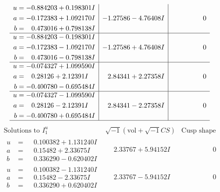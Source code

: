\documentclass[1p]{elsarticle_modified}
\theoremstyle{definition}
\newcommand{\I}{\sqrt{-1}}
\begin{document}
$$\begin{array}{c|c|c}
\begin{aligned}
u &= -0.884203 + 0.198301 I \\
a &= -0.172383 + 1.092170 I \\
b &= \phantom{-}0.473016 + 0.798138 I\end{aligned}
 & -1.27586 - 4.76408 I & \phantom{-0.000000 } 0 \\ \hline\begin{aligned}
u &= -0.884203 - 0.198301 I \\
a &= -0.172383 - 1.092170 I \\
b &= \phantom{-}0.473016 - 0.798138 I\end{aligned}
 & -1.27586 + 4.76408 I & \phantom{-0.000000 } 0 \\ \hline\begin{aligned}
u &= -0.074327 + 1.099590 I \\
a &= \phantom{-}0.28126 + 2.12391 I \\
b &= -0.400780 - 0.695484 I\end{aligned}
 & \phantom{-}2.84341 + 2.27358 I & \phantom{-0.000000 } 0 \\ \hline\begin{aligned}
u &= -0.074327 - 1.099590 I \\
a &= \phantom{-}0.28126 - 2.12391 I \\
b &= -0.400780 + 0.695484 I\end{aligned}
 & \phantom{-}2.84341 - 2.27358 I & \phantom{-0.000000 } 0\\
 \hline 
 \end{array}$$\newpage$$\begin{array}{c|c|c}  
\text{Solutions to }I^u_{1}& \I (\text{vol} + \sqrt{-1}CS) & \text{Cusp shape}\\
 \hline 
\begin{aligned}
u &= \phantom{-}0.100382 + 1.131240 I \\
a &= \phantom{-}0.15482 + 2.33675 I \\
b &= \phantom{-}0.336290 - 0.620402 I\end{aligned}
 & \phantom{-}2.33767 + 5.94152 I & \phantom{-0.000000 } 0 \\ \hline\begin{aligned}
u &= \phantom{-}0.100382 - 1.131240 I \\
a &= \phantom{-}0.15482 - 2.33675 I \\
b &= \phantom{-}0.336290 + 0.620402 I\end{aligned}
 & \phantom{-}2.33767 - 5.94152 I & \phantom{-0.000000 } 0 \\ \hline\begin{aligned}

\end{aligned}
\end{array}$$
\end{document}
